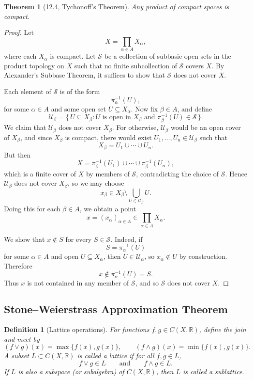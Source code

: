 \documentclass[12pt]{article}
\newtheorem{theorem}{Theorem}
\newtheorem{definition}{Definition}
\begin{document}
\begin{theorem}[12.4, Tychonoff's Theorem]
Any product of compact spaces is compact.
\end{theorem}

\begin{proof}
Let
\[
X=\prod_{\alpha\in A} X_\alpha,
\]
where each $X_\alpha$ is compact. Let $\mathcal{S}$ be a collection of subbasic open sets in
the product topology on $X$ such that no finite subcollection of $\mathcal{S}$ covers $X$.
By Alexander's Subbase Theorem, it suffices to show that $\mathcal{S}$ does not cover $X$.

Each element of $\mathcal{S}$ is of the form
\[
\pi_\alpha^{-1}(U),
\]
for some $\alpha\in A$ and some open set $U\subseteq X_\alpha$. Now fix $\beta\in A$, and define
\[
\mathcal{U}_\beta
=
\{\,U\subseteq X_\beta : U \text{ is open in } X_\beta
\text{ and } \pi_\beta^{-1}(U)\in\mathcal{S}\,\}.
\]
We claim that $\mathcal{U}_\beta$ does not cover $X_\beta$. For otherwise,
$\mathcal{U}_\beta$ would be an open cover of $X_\beta$, and since $X_\beta$ is compact,
there would exist $U_1,\dots,U_n\in\mathcal{U}_\beta$ such that
\[
X_\beta=U_1\cup\cdots\cup U_n.
\]
But then
\[
X=\pi_\beta^{-1}(U_1)\cup\cdots\cup \pi_\beta^{-1}(U_n),
\]
which is a finite cover of $X$ by members of $\mathcal{S}$, contradicting the choice of
$\mathcal{S}$. Hence $\mathcal{U}_\beta$ does not cover $X_\beta$, so we may choose
\[
x_\beta\in X_\beta\setminus \bigcup_{U\in\mathcal{U}_\beta} U.
\]
Doing this for each $\beta\in A$, we obtain a point
\[
x=(x_\alpha)_{\alpha\in A}\in \prod_{\alpha\in A} X_\alpha.
\]

We show that $x\notin S$ for every $S\in\mathcal{S}$. Indeed, if
\[
S=\pi_\alpha^{-1}(U)
\]
for some $\alpha\in A$ and open $U\subseteq X_\alpha$, then $U\in\mathcal{U}_\alpha$, so
$x_\alpha\notin U$ by construction. Therefore
\[
x\notin \pi_\alpha^{-1}(U)=S.
\]
Thus $x$ is not contained in any member of $\mathcal{S}$, and so $\mathcal{S}$ does not
cover $X$.
\end{proof}

\subsection*{Stone--Weierstrass Approximation Theorem}

\begin{definition}[Lattice operations]
For functions $f,g \in C(X,\mathbb{R})$, define the \emph{join} and \emph{meet} by
\[
(f \vee g)(x)=\max\{f(x),g(x)\}, \qquad (f \wedge g)(x)=\min\{f(x),g(x)\}.
\]
A subset $L \subset C(X,\mathbb{R})$ is called a \emph{lattice} if for all $f,g \in L$,
\[
f \vee g \in L
\qquad \text{and} \qquad
f \wedge g \in L.
\]
If $L$ is also a subspace (or subalgebra) of $C(X,\mathbb{R})$, then $L$ is called a
\emph{sublattice}.
\end{definition}
\end{document}
